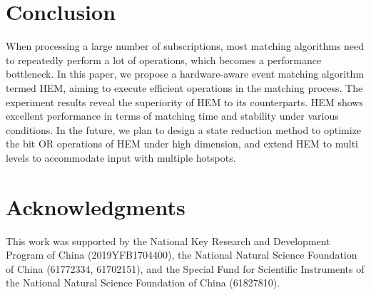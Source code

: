 \documentclass[runningheads]{llncs}
\begin{document}


\section{Conclusion}
\label{co}
When processing a large number of subscriptions, most matching algorithms need to repeatedly perform a lot of operations, which becomes a performance bottleneck.
In this paper, we propose a hardware-aware event matching algorithm termed HEM, aiming to execute efficient operations in the matching process. The experiment results reveal the superiority of HEM to its counterparts. 
HEM shows excellent performance in terms of matching time and stability under various conditions. 
In the future, we plan to design a state reduction method to optimize the bit OR operations of HEM under high dimension, and extend HEM to multi levels to accommodate input with multiple hotspots.

\section*{Acknowledgments}
This work was supported by the National Key Research and Development Program of China (2019YFB1704400), the National Natural Science Foundation of China (61772334, 61702151), and the Special Fund for Scientific Instruments of the National Natural Science Foundation of China (61827810).





\end{document}
